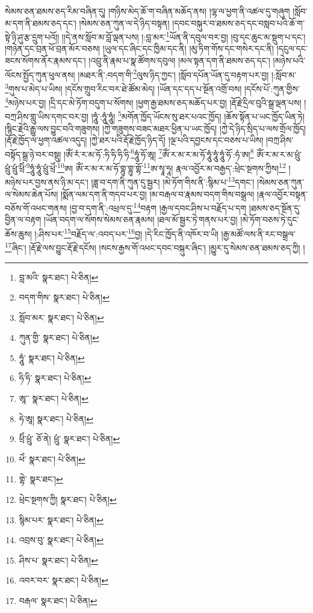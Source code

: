 སེམས་ཅན་ཐམས་ཅད་རིམ་བཞིན་དུ། །གཉིས་མེད་ཆོ་ག་བཞིན་མཆོད་ནས། །ལྷ་ལ་ཕྱག་ནི་འཚལ་དུ་གཞུག །སློབ་མ་དག་ནི་ཐམས་ཅད་དང་། །སེམས་ཅན་ཀུན་ལ་དེ་ཉིད་བསྟན། །དབང་བསྐུར་བ་ཐམས་ཅད་དང་བསླབ་པའི་ཆོ་ག་སྟེ་ཉི་ཤུ་རྩ་དྲུག་པའོ།། །།དེ་ནས་སློབ་མ་བློ་ལྡན་པས། །:བླ་མར་\footnote{བླ་མའི་  སྣར་ཐང་།  པེ་ཅིན། }ཡོན་ནི་དབུལ་བར་བྱ། །བུ་དང་ཆུང་མ་སྡུག་པ་དང་། །གཉེན་དང་བྲན་ཕོ་བྲན་མོར་བཅས། །ཡུལ་དང་ཞིང་དང་ཁྱིམ་དང་ནི། །མུ་ཏིག་གོས་དང་གསེར་དང་ནི། །དངུལ་དང་ཟངས་སོགས་ནོར་རྣམས་དང་། །འབྲུ་ནི་རྣམ་པ་སྣ་ཚོགས་དབུལ། །མལ་སྟན་དག་ནི་ཐམས་ཅད་དང་། །མཉེས་པའི་ལོངས་སྤྱོད་ཀུན་ཕུལ་ནས། །མཐར་ནི་:བདག་གི་\footnote{བདག་གིས་  སྣར་ཐང་།  པེ་ཅིན། }ལུས་ཉིད་ཀྱང་། །སློབ་དཔོན་ཡོན་དུ་བརྟག་པར་བྱ། །:སློབ་མ་\footnote{སློབ་མར་  སྣར་ཐང་།  པེ་ཅིན། }གུས་པ་མེད་པ་ཡིས། །དངོས་གྲུབ་རིང་བར་ཐེ་ཚོམ་མེད། །ཡོན་དང་དད་པ་སྔོན་འགྲོ་བས། །དངོས་པོ་:ཀུན་གྱིས་\footnote{ཀུན་གྱི་  སྣར་ཐང་།  པེ་ཅིན། }མཉེས་པར་བྱ། །དྲི་དང་མེ་ཏོག་བདུག་པ་སོགས། །ཕྱག་རྒྱ་ཐམས་ཅད་མཆོད་པར་བྱ། །རྡོ་རྗེ་དྲིལ་བུའི་སྒྲ་ལྡན་པས། །བཀྲ་ཤིས་གླུ་ཡིས་དགང་བར་བྱ། །ཧཱུཾ་:ཧཱུཾ་ཧཱུཾ། \footnote{ཧཱུཾ་  སྣར་ཐང་།  པེ་ཅིན། }མགོན་ཁྱོད་ཡོངས་སུ་ཐར་པའང་ཁྱོད། །ཆོས་སྟོན་པ་ཡང་ཁྱོད་ཡིན་ཏེ། །སྙིང་རྗེའི་རྒྱུ་ལས་བྱུང་བའི་གཟུགས། །ཀྱེ་གཟུགས་བཟང་མཐར་ཕྱིན་པ་ཡང་ཁྱོད། །ཀྱེ་དེ་ཉིད་སྲིད་པ་ལས་གྲོལ་ཁྱོད། །རྡོ་རྗེ་ཁྱོད་ལ་ཕྱག་འཚལ་འདུད། །ཀྱེ་ཐར་པའི་རྡོ་རྗེ་ཁྱོད་ཉིད་དོ། །ལྔ་པའི་དབྱངས་དང་བཅས་པ་ཡིས། །བཀྲ་ཤིས་བསྟོད་སྒྲ་ཉེ་བར་བསྡུ། །ཨོཾ་རཾ་ར་མ་ཧོ་:ཧི་ཧི་ཧི་ཧི་\footnote{ཧི་ཧི་  སྣར་ཐང་།  པེ་ཅིན། }ཧཱུཾ་ཧོ་ཨཱ། \footnote{ཨཱ་་  སྣར་ཐང་།  པེ་ཅིན། }ཨོཾ་ར་མ་ར་མ་ཧོ་ཧཱུཾ་ཧཱུཾ་ཧཱུཾ་ཧོ་:ཧཾ་ཨ།\footnote{ཧེ་ཨཱ།  སྣར་ཐང་།  པེ་ཅིན། } ཨོཾ་ར་མ་ར་མ་ཕྲུཾ་ཕྲུཾ་ཕྲུཾ་ཕྲིཾ་\footnote{ཕྲིཾ་ཕྲུཾ་  ཅོ་ནེ། ཕྲུཾ་  སྣར་ཐང་།  པེ་ཅིན། }ཧཱུཾ་ཧཱུཾ་ཕྲུཾ་ཕྲེཾ་\footnote{ཕེཾ་  སྣར་ཐང་།  པེ་ཅིན། }ཨ། ཨོཾ་ར་མ་ར་མ་ཧོ་གྷུ་གྷུ་གྷོ་\footnote{གྷེ་  སྣར་ཐང་། }ཨ་སྭཱ་ཧཱ། རྣལ་འབྱོར་མ་བརྒྱད་:ཕྲེང་སྔགས་ཀྱིས།\footnote{ཕྲེང་སྔགས་ཀྱི།  སྣར་ཐང་།  པེ་ཅིན། } །མཉེས་པར་བྱས་ནས་ཉི་མ་དང་། །ཟླ་བ་དག་ནི་ཀུན་དུ་སྦྱར། །མེ་ཏོག་གིས་ནི་:སྙིམ་པ་\footnote{སྙིམ་པར་  སྣར་ཐང་།  པེ་ཅིན། }དགང་། །སེམས་ཅན་ཀུན་ལ་སེམས་ཆེན་པོས། །སྨོན་ལམ་དག་ནི་གདབ་པར་བྱ། །མ་བརྒལ་བ་རྣམས་བདག་གིས་བསྒྲལ། །རྣལ་འབྱོར་བསྟན་བཅོས་གོ་འཕང་གནས། །བྱ་བ་དག་ནི་:འཕྲལ་དུ་\footnote{འབྲས་བུ་  སྣར་ཐང་།  པེ་ཅིན། }བརྟག །རྒྱལ་དབང་ཤིས་པ་བརྗོད་པ་དག །ཐམས་ཅད་སྔོན་དུ་བྱིན་ལ་བརྟག །ཡོན་བདག་ལ་སོགས་སེམས་ཅན་རྣམས། །ཐལ་མོ་སྦྱར་ཏེ་གནས་པར་བྱ། །མེ་ཏོག་བཅས་ཏེ་དུང་ཆོས་ཆུས། །:ཤིས་པར་\footnote{ཤིས་པ་  སྣར་ཐང་།  པེ་ཅིན། }བརྗོད་ལ་:འབད་པར་\footnote{འབར་བར་  སྣར་ཐང་།  པེ་ཅིན། }བྱ། །དེ་རིང་ཁྱོད་ནི་འཁོར་བ་ཡི། །རྒྱ་མཚོ་ལས་ནི་རང་བསྒྲལ་\footnote{བརྒལ་  སྣར་ཐང་།  པེ་ཅིན། }ཞིང་། །རྡོ་རྗེ་ལས་བྱུང་རྡོ་རྗེ་དངོས། །སངས་རྒྱས་གོ་འཕང་དབང་བསྐུར་ཞིང་། །མྱུར་དུ་སེམས་ཅན་ཐམས་ཅད་ཀྱི། །
